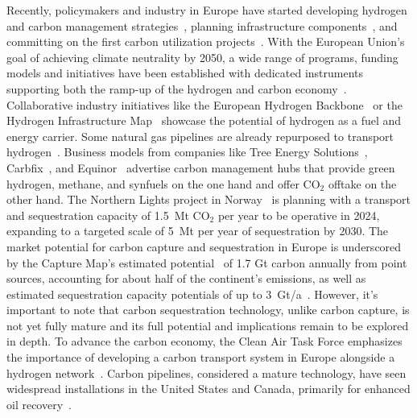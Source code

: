 \documentclass[twocolumn]{article}
\newcommand{\COtwo}{CO$_2$}
\begin{document}
Recently, policymakers and industry in Europe have started developing hydrogen and carbon management strategies~\cite{GermanyDevelopingStrategy2023,CarbonManagementStrategie}, planning infrastructure components~\cite{CONetz}, and committing on the first carbon utilization projects~\cite{EFuelsPilotPlant2022,OrstedAssumesFull,GROUNDBREAKINGEFUELPRODUCTION,DLREfuelsDLR}. With the European Union's goal of achieving climate neutrality by 2050, a wide range of programs, funding models and initiatives have been established with dedicated instruments supporting both the ramp-up of the hydrogen and carbon economy~\cite{eu2023netzero,europeangreendeal,europeaninnovationfund}.
Collaborative industry initiatives like the European Hydrogen Backbone~\cite{gasforclimateEuropeanHydrogenBackbone2022} or the Hydrogen Infrastructure Map~\cite{H2InfrastructureMap} showcase the potential of hydrogen as a fuel and energy carrier. Some natural gas pipelines are already repurposed to transport hydrogen~\cite{RohrFreiFuer}. Business models from companies like Tree Energy Solutions~\cite{TESHydrogenLife2023}, Carbfix~\cite{WeTurnCO2}, and Equinor~\cite{adomaitisEquinorRWEBuild2023} advertise carbon management hubs that provide green hydrogen, methane, and synfuels on the one hand and offer \COtwo{} offtake on the other hand. The Northern Lights project in Norway~\cite{NorthernLightsWhat} is planning with a transport and sequestration capacity of 1.5~Mt \COtwo{} per year to be operative in 2024, expanding to a targeted scale of 5~Mt per year of sequestration by 2030.
The market potential for carbon capture and sequestration in Europe is underscored by the Capture Map's estimated potential~\cite{ToolsGreenTransition} of 1.7 Gt carbon annually from point sources, accounting for about half of the continent's emissions, as well as estimated sequestration capacity potentials of up to 3~Gt/a~\cite{europeancommissionEuropeanCO2Storage}. However, it's important to note that carbon sequestration technology, unlike carbon capture, is not yet fully mature and its full potential and implications remain to be explored in depth.
To advance the carbon economy, the Clean Air Task Force emphasizes the importance of developing a carbon transport system in Europe alongside a hydrogen network~\cite{lockwoodEuropeanStrategyCarbon}. Carbon pipelines, considered a mature technology, have seen widespread installations in the United States and Canada, primarily for enhanced oil recovery~\cite{righettiSitingCarbonDioxide2017,friedmannNETZEROGEOSPHERICRETURN}.
\end{document}
